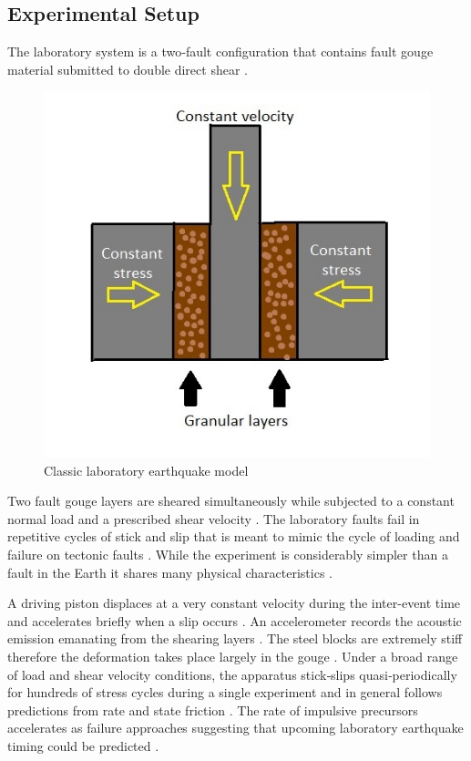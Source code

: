 \documentclass[]{llncs} %
\begin{document}
\subsection{Experimental Setup}
The laboratory system is a two‐fault configuration that contains fault gouge material submitted to double direct shear \cite{kaggle}. \par
\begin{figure}[h]
	\centering
	\includegraphics[width=.6\linewidth]{lab}
	\caption{Classic laboratory earthquake model }
	\label{fig:lab}
\end{figure}
Two fault gouge layers are sheared simultaneously while subjected to a constant normal load and a prescribed shear velocity \cite{kaggle}. The laboratory faults fail in repetitive cycles of stick and slip that is meant to mimic the cycle of loading and failure on tectonic faults \cite{kaggle}. While the experiment is considerably simpler than a fault in the Earth it shares many physical characteristics \cite{kaggle}. \par

A driving piston displaces at a very constant velocity during the inter-event time and accelerates briefly when a slip occurs \cite{Bertrand}. An accelerometer records the acoustic emission emanating from the shearing layers \cite{Bertrand}. The steel blocks are extremely stiff therefore the deformation takes place largely in the gouge \cite{Bertrand}. Under a broad range of load and shear velocity conditions, the apparatus stick‐slips quasi‐periodically for hundreds of stress cycles during a single experiment and in general follows predictions from rate and state friction \cite{Bertrand}. The rate of impulsive precursors accelerates as failure approaches suggesting that upcoming laboratory earthquake timing could be predicted \cite{Bertrand}. \par
\end{document}
